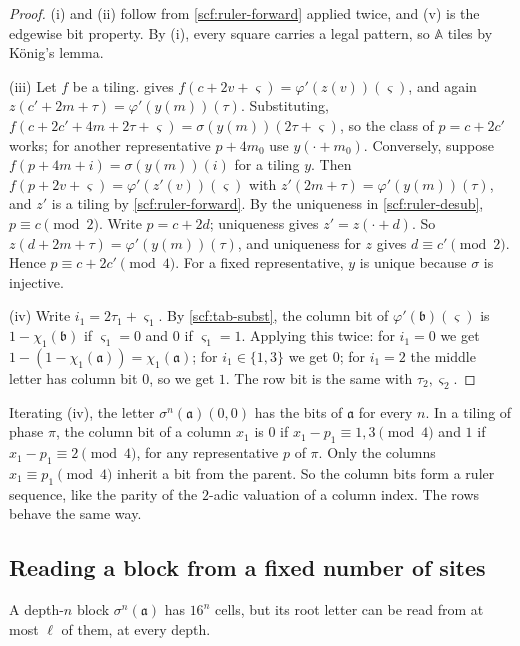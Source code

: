 \begin{proof}
(i) and (ii) follow from \cref{scf:ruler-forward} applied twice, and (v) is the edgewise bit property. By (i), every square carries a legal pattern, so $\mathbb A$ tiles by K\"onig's lemma.

(iii) Let $f$ be a tiling.  gives $f(c+2v+\varsigma)=\varphi'(z(v))(\varsigma)$, and again $z(c'+2m+\tau)=\varphi'(y(m))(\tau)$. Substituting, $f(c+2c'+4m+2\tau+\varsigma)=\sigma(y(m))(2\tau+\varsigma)$, so the class of $p=c+2c'$ works; for another representative $p+4m_0$ use $y(\cdot+m_0)$. Conversely, suppose $f(p+4m+i)=\sigma(y(m))(i)$ for a tiling $y$. Then $f(p+2v+\varsigma)=\varphi'(z'(v))(\varsigma)$ with $z'(2m+\tau)=\varphi'(y(m))(\tau)$, and $z'$ is a tiling by \cref{scf:ruler-forward}. By the uniqueness in \cref{scf:ruler-desub}, $p\equiv c\pmod2$. Write $p=c+2d$; uniqueness gives $z'=z(\cdot+d)$. So $z(d+2m+\tau)=\varphi'(y(m))(\tau)$, and uniqueness for $z$ gives $d\equiv c'\pmod 2$. Hence $p\equiv c+2c'\pmod4$. For a fixed representative, $y$ is unique because $\sigma$ is injective.

(iv) Write $i_1=2\tau_1+\varsigma_1$. By \cref{scf:tab-subst}, the column bit of $\varphi'(\mathfrak b)(\varsigma)$ is $1-\chi_1(\mathfrak b)$ if $\varsigma_1=0$ and $0$ if $\varsigma_1=1$. Applying this twice: for $i_1=0$ we get $1-(1-\chi_1(\mathfrak a))=\chi_1(\mathfrak a)$; for $i_1\in\{1,3\}$ we get $0$; for $i_1=2$ the middle letter has column bit $0$, so we get $1$. The row bit is the same with $\tau_2,\varsigma_2$.
\end{proof}

Iterating (iv), the letter $\sigma^n(\mathfrak a)(0,0)$ has the bits of $\mathfrak a$ for every $n$. In a tiling of phase $\pi$, the column bit of a column $x_1$ is $0$ if $x_1-p_1\equiv1,3\pmod4$ and $1$ if $x_1-p_1\equiv2\pmod 4$, for any representative $p$ of $\pi$. Only the columns $x_1\equiv p_1\pmod4$ inherit a bit from the parent. So the column bits form a ruler sequence, like the parity of the $2$-adic valuation of a column index. The rows behave the same way.

\subsection{Reading a block from a fixed number of sites}\label{scf:sub-ports}

A depth-$n$ block $\sigma^n(\mathfrak a)$ has $16^n$ cells, but its root letter can be read from at most $\ell$ of them, at every depth.

